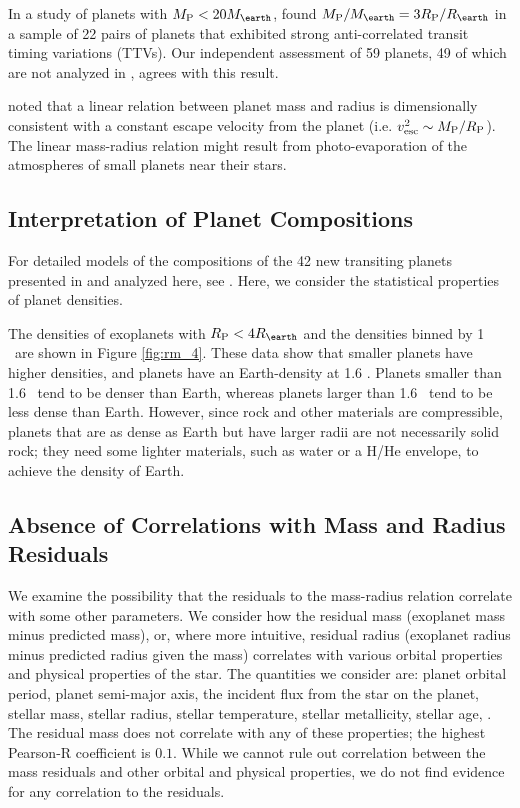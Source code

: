 \documentclass[iop]{emulateapj}
\newcommand{\rspecial}{4 \rearth}
\begin{document}
In a study of planets with $\mpl < 20\mearth$, \citet{WL2013} found $\mpl/\mearth = 3 \rpl/\rearth$ in a sample of 22 pairs of planets that exhibited strong anti-correlated transit timing variations (TTVs).  Our independent assessment of 59 planets, 49 of which are not analyzed in \citet{WL2013}, agrees with this result.

\citet{WL2013} noted that a linear relation between planet mass and radius is dimensionally consistent with a constant escape velocity from the planet (i.e. $v_{\mathrm{esc}}^2 \sim M_{\rm P}/R_{\rm P}$).  The linear mass-radius relation might result from photo-evaporation of the atmospheres of small planets near their stars.

\subsection{Interpretation of Planet Compositions}
For detailed models of the compositions of the 42 new transiting planets presented in \citet{Marcy2013} and analyzed here, see \citet{Rogers2013}.  Here, we consider the statistical properties of planet densities.

The densities of exoplanets with $\rpl < \rspecial$ and the densities binned by 1 \rearth\ are shown in Figure \ref{fig:rm_4}.  These data show that smaller planets have higher densities, and planets have an Earth-density at 1.6 \rearth.  Planets smaller than 1.6 \rearth\ tend to be denser than Earth, whereas planets larger than 1.6 \rearth\ tend to be less dense than Earth.  However, since rock and other materials are compressible, planets that are as dense as Earth but have larger radii are not necessarily solid rock; they need some lighter materials, such as water or a H/He envelope, to achieve the density of Earth.

\subsection{Absence of Correlations with Mass and Radius Residuals}
We examine the possibility that the residuals to the mass-radius relation correlate with some other parameters.  We consider how the residual mass (exoplanet mass minus predicted mass), or, where more intuitive, residual radius (exoplanet radius minus predicted radius given the mass) correlates with various orbital properties and physical properties of the star.  The quantities we consider are: planet orbital period, planet semi-major axis, the incident flux from the star on the planet, stellar mass, stellar radius, stellar temperature, stellar metallicity, stellar age, .  The residual mass does not correlate with any of these properties; the highest Pearson-R coefficient is $0.1$.  While we cannot rule out correlation between the mass residuals and other orbital and physical properties, we do not find evidence for any correlation to the residuals.
\end{document}
